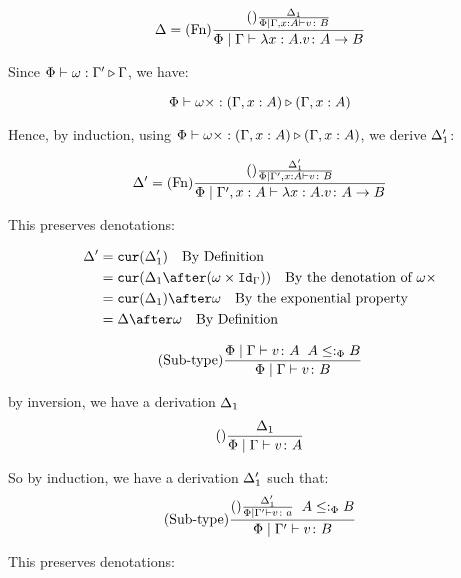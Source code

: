 \documentclass{report}
\begin{document}
    \begin{equation}
        \Delta = (\text{Fn}) \frac{
            (\text{}) \frac{\Delta_1}{\Phi\mid\Gamma, x: A \vdash v \colon B}
        }{\Phi\mid\Gamma \vdash \lambda x : A. v \colon A\rightarrow B}
    \end{equation}

    Since $\Phi\vdash \omega : \Gamma' \triangleright \Gamma$, we have:

    \begin{equation}
        \Phi\vdash \omega\times : (\Gamma,x:  A) \triangleright (\Gamma, x: A)
    \end{equation}

    Hence, by induction, using $\Phi\vdash \omega\times : (\Gamma,x:  A) \triangleright (\Gamma, x: A)$, we derive $\Delta_1'$:

    \begin{equation}
        \Delta' = (\text{Fn}) \frac{
            (\text{}) \frac{\Delta_1'}{\Phi\mid\Gamma',x: A \vdash v \colon B}
        }{\Phi\mid\Gamma',x: A \vdash \lambda x : A. v \colon A\rightarrow B}
    \end{equation}

    This preserves denotations:


    \begin{align}
    \D' & = \cur{\D_1'} \qt{By Definition}\\
    & = \cur{\D_1\after(\w\times \idg)}\qt{By the denotation of $\w\x$} \\
    &= \cur{\D_1}\after\w\qt{By the exponential property}\\
    &= \D\after \w \qt{By Definition}
    \end{align}



    \begin{equation}
        (\text{Sub-type}) \frac{\Phi\mid\Gamma \vdash v \colon A\;\; A\leq:_\Phi B}{\Phi\mid\Gamma \vdash v \colon B}
    \end{equation}

    by inversion, we have a derivation $\Delta_1$
    \begin{equation}
        (\text{}) \frac{\Delta_1}{\Phi\mid\Gamma \vdash v \colon A}
    \end{equation}

    So by induction, we have a derivation $\Delta_1'$ such that:
    \begin{equation}
        (\text{Sub-type}) \frac{(\text{}) \frac{\Delta_1'}{\Phi\mid\Gamma' \vdash v \colon a}\;\; A \leq:_\Phi B}{\Phi\mid\Gamma' \vdash v \colon B}
    \end{equation}

    This preserves denotations:
\end{document}
